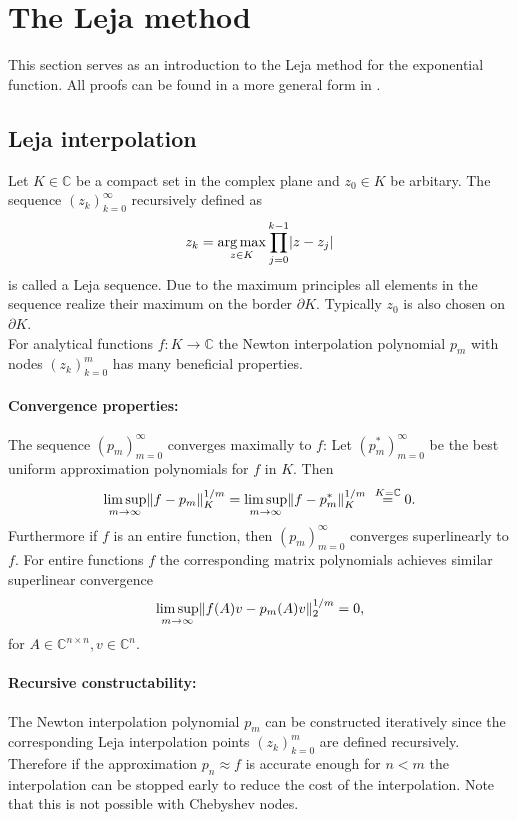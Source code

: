 \documentclass{scrartcl}
\begin{document}
\section{The Leja method}
This section serves as an introduction to the Leja method for the exponential function. All proofs can be found in a more general form in \cite{advdif}. 

\subsection{Leja interpolation}
Let $K\in\mathbb{C}$ be a compact set in the complex plane and $z_0\in K$ be arbitary. The sequence $(z_k)_{k=0}^{\infty}$ recursively defined as
\[z_k = \underset{{z\in K}}{\operatorname{arg\,max}}\displaystyle\prod_{j=0}^{k-1}\lvert z-z_j\rvert\]
is called a Leja sequence. Due to the maximum principles all elements in the sequence realize their maximum on the border $\partial K$. Typically $z_0$ is also chosen on $\partial K$.\\
For analytical functions $f\!:K\to\mathbb{C}$ the Newton interpolation polynomial $p_m$ with nodes $(z_k)_{k=0}^{m}$ has many beneficial properties. 
\paragraph{Convergence properties:}
The sequence $(p_m)_{m=0}^\infty$ converges maximally to $f$: Let $(p_m^{*})_{m=0}^\infty$ be the best uniform approximation polynomials for $f$ in $K$. Then
\[\limsup\limits_{m \rightarrow \infty}\lVert f-p_m\rVert_{K}^{1/m} = \limsup\limits_{m \rightarrow \infty}\lVert f-p_m^{*}\rVert_{K}^{1/m} \ \overset{{K=\mathbb{C}}}{=} 0. \]
Furthermore if $f$ is an entire function, then $(p_m)_{m=0}^\infty$ converges superlinearly to $f$. For entire functions $f$ the corresponding matrix polynomials achieves similar superlinear convergence
\[\limsup\limits_{m \rightarrow \infty}\lVert f(A)v-p_m(A)v\rVert_{2}^{1/m} = 0, \]
for $A\in\mathbb{C}^{n\times n}, v\in\mathbb{C}^n$.

\paragraph{Recursive constructability:}
The Newton interpolation polynomial $p_m$ can be constructed iteratively since the corresponding Leja interpolation points $(z_k)_{k=0}^{m}$ are defined recursively. Therefore if the approximation $p_n \approx f$ is accurate enough for $n<m$ the interpolation can be stopped early to reduce the cost of the interpolation. Note that this is not possible with Chebyshev nodes.
\end{document}

